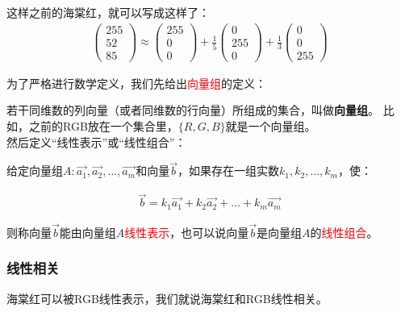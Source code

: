 \documentclass[UTF8]{ctexart}
\begin{document}
这样之前的海棠红，就可以写成这样了：\\

\begin{equation}
\begin{aligned}
\begin{pmatrix} 255 \\ 52 \\ 85 \end{pmatrix} \approx
\begin{pmatrix} 255 \\ 0 \\ 0 \end{pmatrix} +
\frac{1}{5}\begin{pmatrix} 0 \\ 255 \\ 0 \end{pmatrix} +
\frac{1}{3}\begin{pmatrix} 0 \\ 0 \\ 255 \end{pmatrix}
\end{aligned}
\end{equation}

为了严格进行数学定义，我们先给出\textcolor{red}{向量组}的定义：

若干同维数的列向量（或者同维数的行向量）所组成的集合，叫做\textbf{向量组}。 比如，之前的RGB放在一个集合里，$\{R,G,B\}$就是一个向量组。\\

然后定义“线性表示”或“线性组合”：

给定向量组$A: \vec{a_{1}},\vec{a_{2}},\dots,\vec{a_{m}}$和向量$\vec{b}$，如果存在一组实数$k_{1},k_{2},\dots,k_{m}$，使：

\begin{equation}
\begin{aligned}
\vec{b}=k_{1}\vec{a_{1}}+k_{2}\vec{a_{2}}+\dots+k_{m}\vec{a_{m}}
\end{aligned}
\end{equation}

则称向量$\vec{b}$能由向量组$A$\textcolor{red}{线性表示}，也可以说向量$\vec{b}$是向量组$A$的\textcolor{red}{线性组合}。

\subsubsection{线性相关}

海棠红可以被RGB线性表示，我们就说海棠红和RGB线性相关。
\end{document}
